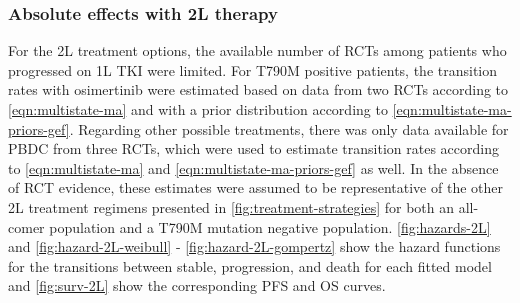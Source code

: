 \documentclass[11pt,final,fleqn]{article}\usepackage[]{graphicx}\usepackage[]{color}
\theoremstyle{plain}
\begin{document}
{\subsubsection{Absolute effects with 2L therapy}
For the 2L treatment options, the available number of RCTs among patients who progressed on 1L TKI were limited. For T790M positive patients, the transition rates with osimertinib were estimated based on data from two RCTs according to \autoref{eqn:multistate-ma} and with a prior distribution according to \autoref{eqn:multistate-ma-priors-gef}. Regarding other possible treatments, there was only data available for PBDC from three RCTs, which were used to estimate transition rates according to \autoref{eqn:multistate-ma} and \autoref{eqn:multistate-ma-priors-gef} as well. In the absence of RCT evidence, these estimates were assumed to be representative of the other 2L treatment regimens presented in \autoref{fig:treatment-strategies} for both an all-comer population and a T790M mutation negative population. \autoref{fig:hazards-2L} and \autoref{fig:hazard-2L-weibull} -  \autoref{fig:hazard-2L-gompertz} show the hazard functions for the transitions between stable, progression, and death for each fitted model and \autoref{fig:surv-2L} show the corresponding PFS and OS curves.

\FloatBarrier



}
\end{document}
